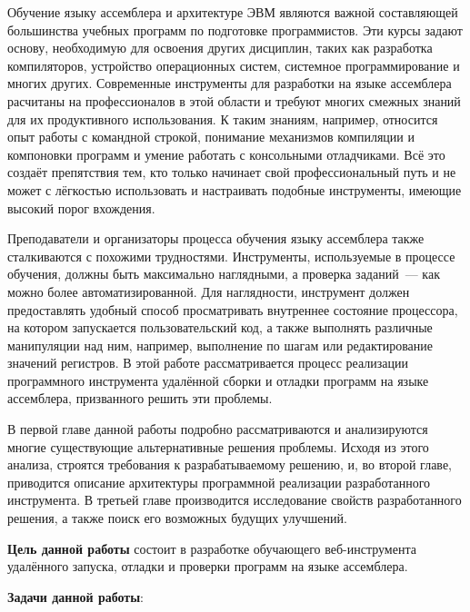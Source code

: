 \documentclass[a4paper,article,14pt]{extarticle}
\begin{document}


\tableofcontents
\pagebreak


Обучение языку ассемблера и архитектуре ЭВМ являются важной составляющей большинства учебных программ по подготовке программистов. Эти курсы задают основу, необходимую для освоения других дисциплин, таких как разработка компиляторов, устройство операционных систем, системное программирование и многих других. Современные инструменты для разработки на языке ассемблера расчитаны на профессионалов в этой области и требуют многих смежных знаний для их продуктивного использования. К таким знаниям, например, относится опыт работы с командной строкой, понимание механизмов компиляции и компоновки программ и умение работать с консольными отладчиками. Всё это создаёт препятствия тем, кто только начинает свой профессиональный путь и не может с лёгкостью использовать и настраивать подобные инструменты, имеющие высокий порог вхождения.

Преподаватели и организаторы процесса обучения языку ассемблера также сталкиваются с похожими трудностями. Инструменты, используемые в процессе обучения, должны быть максимально наглядными, а проверка заданий~--- как можно более автоматизированной. Для наглядности, инструмент должен предоставлять удобный способ просматривать внутреннее состояние процессора, на котором запускается пользовательский код, а также выполнять различные манипуляции над ним, например, выполнение по шагам или редактирование значений регистров. В этой работе рассматривается процесс реализации программного инструмента удалённой сборки и отладки программ на языке ассемблера, призванного решить эти проблемы.

В первой главе данной работы подробно рассматриваются и анализируются многие существующие альтернативные решения проблемы. Исходя из этого анализа, строятся требования к разрабатываемому решению, и, во второй главе, приводится описание архитектуры программной реализации разработанного инструмента. В третьей главе производится исследование свойств разработанного решения, а также поиск его возможных будущих улучшений.

\pagebreak
{}

\textbf{Цель данной работы} состоит в разработке обучающего веб-инструмента удалённого запуска, отладки и проверки программ на языке ассемблера.

\textbf{Задачи данной работы}:
\end{document}
